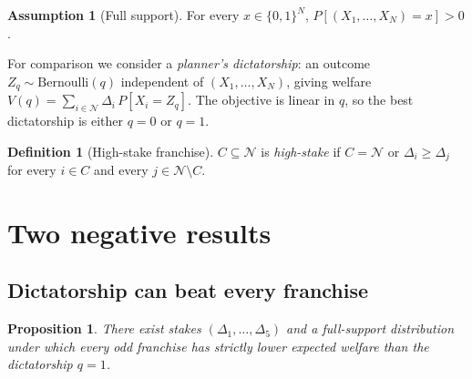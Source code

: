\documentclass{article}
\theoremstyle{plain}
\newtheorem{proposition}{Proposition}
\theoremstyle{definition}
\newtheorem{definition}{Definition}
\newtheorem{assumption}{Assumption}
\newcommand{\N}{\mathcal{N}}
\begin{document}
\begin{assumption}[Full support]\label{ass:full-support}
For every $x \in \{0,1\}^N$, $P[(X_1, \ldots, X_N) = x] > 0$.
\end{assumption}

For comparison we consider a \emph{planner's dictatorship}: an outcome $Z_q \sim \mathrm{Bernoulli}(q)$ independent of $(X_1, \ldots, X_N)$, giving welfare $V(q) = \sum_{i \in \N} \Delta_i\, P[X_i = Z_q]$.  The objective is linear in $q$, so the best dictatorship is either $q = 0$ or $q = 1$.

\begin{definition}[High-stake franchise]\label{def:high-stake}
$C \subseteq \N$ is \emph{high-stake} if $C = \N$ or $\Delta_i \geq \Delta_j$ for every $i \in C$ and every $j \in \N \setminus C$.
\end{definition}

\section{Two negative results}\label{sec:negative}

\subsection{Dictatorship can beat every franchise}

\begin{proposition}\label{prop:dict}
There exist stakes $(\Delta_1, \ldots, \Delta_5)$ and a full-support distribution under which every odd franchise has strictly lower expected welfare than the dictatorship $q = 1$.
\end{proposition}
\end{document}
